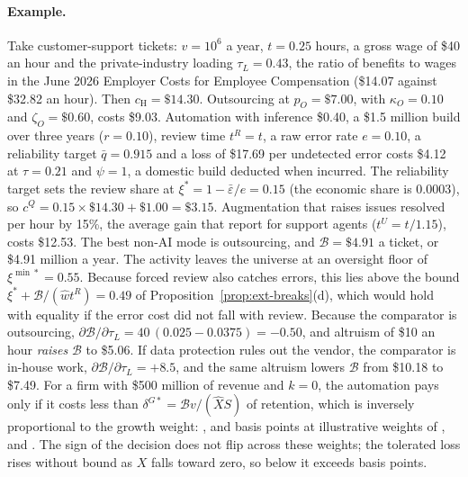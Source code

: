 \paragraph{Example.} Take customer-support tickets: $v=10^6$ a year, $t=0.25$ hours, a gross wage of \$40 an hour and the private-industry loading $\tau_L=0.43$, the ratio of benefits to wages in the June 2026 Employer Costs for Employee Compensation (\$14.07 against \$32.82 an hour). Then $c_{\mathrm H}=\$14.30$. Outsourcing at $p_O=\$7.00$, with $\kappa_O=0.10$ and $\zeta_O=\$0.60$, costs \$9.03. Automation with inference \$0.40, a \$1.5 million build over three years ($r=0.10$), review time $t^R=t$, a raw error rate $e=0.10$, a reliability target $\bar q=0.915$ and a loss of \$17.69 per undetected error costs \$4.12 at $\tau=0.21$ and $\psi=1$, a domestic build deducted when incurred. The reliability target sets the review share at $\xi^*=1-\bar\varepsilon/e=0.15$ (the economic share is 0.0003), so $c^Q=0.15\times\$14.30+\$1.00=\$3.15$. Augmentation that raises issues resolved per hour by 15\%, the average gain that \citet{brynjolfsson2025generative} report for support agents ($t^U=t/1.15$), costs \$12.53. The best non-AI mode is outsourcing, and $\mathcal B=\$4.91$ a ticket, or \$4.91 million a year. The activity leaves the universe at an oversight floor of $\xi^{\min*}=0.55$. Because forced review also catches errors, this lies above the bound $\xi^*+\mathcal B/(\hat wt^R)=0.49$ of Proposition~\ref{prop:ext-breaks}(d), which would hold with equality if the error cost did not fall with review. Because the comparator is outsourcing, $\partial\mathcal B/\partial\tau_L=40\,(0.025-0.0375)=-0.50$, and altruism of \$10 an hour \emph{raises} $\mathcal B$ to \$5.06. If data protection rules out the vendor, the comparator is in-house work, $\partial\mathcal B/\partial\tau_L=+8.5$, and the same altruism lowers $\mathcal B$ from \$10.18 to \$7.49. For a firm with \$500 million of revenue and $k=0$, the automation pays only if it costs less than $\delta^{G*}=\mathcal B v/(\hat XS)$ of retention, which is inversely proportional to the growth weight: \extXbRetOne, \extXbRetTwo{} and \extXbRetThree{} basis points at illustrative weights of \extXbOne, \extXbTwo{} and \extXbThree. The sign of the decision does not flip across these weights; the tolerated loss rises without bound as $X$ falls toward zero, so below \extXbOne{} it exceeds \extXbRetOne{} basis points. %

